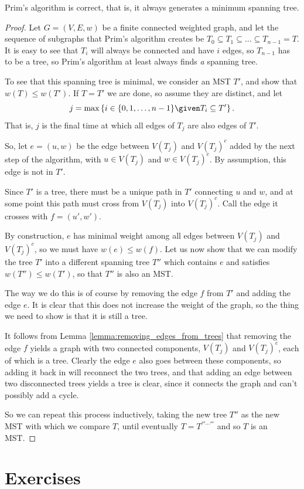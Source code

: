 \documentclass[nobib]{tufte-handout}
\begin{document}
\begin{theorem}
  Prim's algorithm is correct, that is, it always generates a minimum spanning tree.

  \begin{proof}
    Let $G = (V,E,w)$ be a finite connected weighted graph, and let the sequence of subgraphs that Prim's algorithm creates be $T_0 \subseteq T_1 \subseteq \ldots \subseteq T_{n-1} = T$. It is easy to see that $T_i$ will always be connected and have $i$ edges, so $T_{n-1}$ has to be a tree, so Prim's algorithm at least always finds \emph{a} spanning tree.
    
    To see that this spanning tree is minimal, we consider an MST $T'$, and show that $w(T) \leq w(T')$. If $T = T'$ we are done, so assume they are distinct, and let
    $$j = \max\left\{i \in \{0,1,\ldots,n-1\} \given T_i \subseteq T'\right\}.$$
    That is, $j$ is the final time at which all edges of $T_j$ are also edges of $T'$.

    So, let $e = (u, w)$ be the edge between $V(T_j)$ and $V(T_j)^c$ added by the next step of the algorithm, with $u \in V(T_j)$ and $w \in V(T_j)^c$. By assumption, this edge is not in $T'$.
    
    Since $T'$ is a tree, there must be a unique path in $T'$ connecting $u$ and $w$, and at some point this path must cross from $V(T_j)$ into $V(T_j)^c$. Call the edge it crosses with $f = (u', w')$.

    By construction, $e$ has minimal weight among all edges between $V(T_j)$ and $V(T_j)^c$, so we must have $w(e) \leq w(f)$. Let us now show that we can modify the tree $T'$ into a different spanning tree $T''$ which contains $e$ and satisfies $w(T'') \leq w(T')$, so that $T''$ is also an MST.

    The way we do this is of course by removing the edge $f$ from $T'$ and adding the edge $e$. It is clear that this does not increase the weight of the graph, so the thing we need to show is that it is still a tree. 
    
    It follows from Lemma \ref{lemma:removing_edges_from_trees} that removing the edge $f$ yields a graph with two connected components, $V(T_j)$ and $V(T_j)^c$, each of which is a tree. Clearly the edge $e$ also goes between these components, so adding it back in will reconnect the two trees, and that adding an edge between two disconnected trees yields a tree is clear, since it connects the graph and can't possibly add a cycle.

    So we can repeat this process inductively, taking the new tree $T''$ as the new MST with which we compare $T$, until eventually $T = T^{'''\cdots'''}$ and so $T$ is an MST.
  \end{proof}
\end{theorem}

\section{Exercises}

%
%
\end{document}
